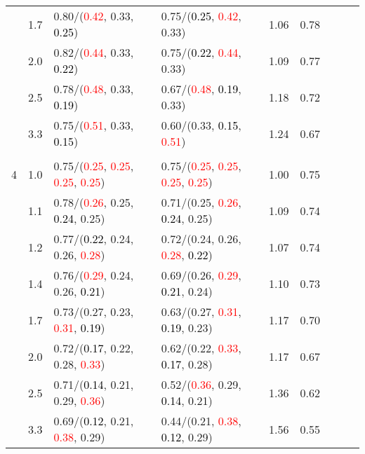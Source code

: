 \documentclass[10pt,a4paper]{report}
\begin{document}
\begin{table}[!htbp]
\begin{center}
{\begin{tabular}{ccllccccc}
			&1.7&0.80/(\textcolor{red}{0.42}, 0.33, \textcolor{black}{0.25})&0.75/(\textcolor{black}{0.25}, \textcolor{red}{0.42}, 0.33)&1.06&0.78\\
			&2.0&0.82/(\textcolor{red}{0.44}, 0.33, \textcolor{black}{0.22})&0.75/(\textcolor{black}{0.22}, \textcolor{red}{0.44}, 0.33)&1.09&0.77\\
			&2.5&0.78/(\textcolor{red}{0.48}, 0.33, \textcolor{black}{0.19})&0.67/(\textcolor{red}{0.48}, \textcolor{black}{0.19}, 0.33)&1.18&0.72\\
			&3.3&0.75/(\textcolor{red}{0.51}, 0.33, \textcolor{black}{0.15})&0.60/(0.33, \textcolor{black}{0.15}, \textcolor{red}{0.51})&1.24&0.67\\
			&&&&\\
			4			&1.0&0.75/(\textcolor{red}{0.25}, \textcolor{red}{0.25}, \textcolor{red}{0.25}, \textcolor{red}{0.25})&0.75/(\textcolor{red}{0.25}, \textcolor{red}{0.25}, \textcolor{red}{0.25}, \textcolor{red}{0.25})&1.00&0.75\\
			&1.1&0.78/(\textcolor{red}{0.26}, 0.25, \textcolor{black}{0.24}, 0.25)&0.71/(0.25, \textcolor{red}{0.26}, \textcolor{black}{0.24}, 0.25)&1.09&0.74\\
			&1.2&0.77/(\textcolor{black}{0.22}, 0.24, 0.26, \textcolor{red}{0.28})&0.72/(0.24, 0.26, \textcolor{red}{0.28}, \textcolor{black}{0.22})&1.07&0.74\\
			&1.4&0.76/(\textcolor{red}{0.29}, 0.24, 0.26, \textcolor{black}{0.21})&0.69/(0.26, \textcolor{red}{0.29}, \textcolor{black}{0.21}, 0.24)&1.10&0.73\\
			&1.7&0.73/(0.27, 0.23, \textcolor{red}{0.31}, \textcolor{black}{0.19})&0.63/(0.27, \textcolor{red}{0.31}, \textcolor{black}{0.19}, 0.23)&1.17&0.70\\
			&2.0&0.72/(\textcolor{black}{0.17}, 0.22, 0.28, \textcolor{red}{0.33})&0.62/(0.22, \textcolor{red}{0.33}, \textcolor{black}{0.17}, 0.28)&1.17&0.67\\
			&2.5&0.71/(\textcolor{black}{0.14}, 0.21, 0.29, \textcolor{red}{0.36})&0.52/(\textcolor{red}{0.36}, 0.29, \textcolor{black}{0.14}, 0.21)&1.36&0.62\\
			&3.3&0.69/(\textcolor{black}{0.12}, 0.21, \textcolor{red}{0.38}, 0.29)&0.44/(0.21, \textcolor{red}{0.38}, \textcolor{black}{0.12}, 0.29)&1.56&0.55\\
			\bottomrule
		\end{tabular}}
	\end{center}
\end{table}
\end{document}
